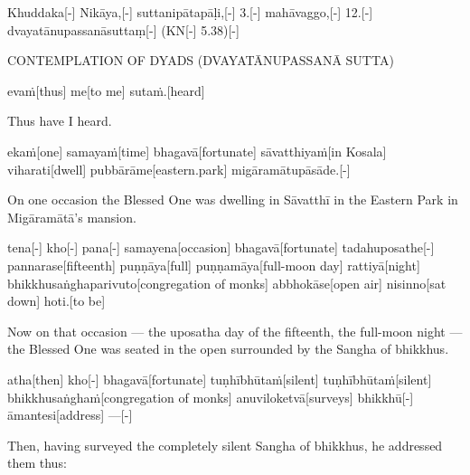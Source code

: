 
\begin{samepage}
\begingl[glneveryline={\PaliGlossA,\PaliGlossB}]
Khuddaka[-] Nikāya,[-] suttanipātapāḷi,[-] 3.[-] mahāvaggo,[-] 12.[-] dvayatānupassanāsuttaṃ[-] (KN[-] 5.38)[-]
\endgl
\nopagebreak
\linespread{0.5}
\begin{spacin}{0.2}
{ CONTEMPLATION OF DYADS (DVAYATĀNUPASSANĀ SUTTA)}
\end{spacin}
\vskip 12pt
\end{samepage}
\vskip 0.2in
\begin{samepage}
\begingl[glneveryline={\PaliGlossA,\PaliGlossB}]
evaṁ[thus] me[to me] sutaṁ.[heard]
\endgl
\nopagebreak
\linespread{0.5}
\begin{spacin}{0.2}
{\PaliGlossFT Thus have I heard.}
\end{spacin}
\vskip 12pt
\end{samepage}
\begin{samepage}
\begingl[glneveryline={\PaliGlossA,\PaliGlossB}]
ekaṁ[one] samayaṁ[time] bhagavā[fortunate] sāvatthiyaṁ[in Kosala] viharati[dwell] pubbārāme[eastern.park] migāramātupāsāde.[-]
\endgl
\nopagebreak
\linespread{0.5}
\begin{spacin}{0.2}
{\PaliGlossFT On one occasion the Blessed One was dwelling in Sāvatthī in the Eastern Park in Migāramātā’s mansion.}
\end{spacin}
\vskip 12pt
\end{samepage}
\begin{samepage}
\begingl[glneveryline={\PaliGlossA,\PaliGlossB}]
tena[-] kho[-] pana[-] samayena[occasion] bhagavā[fortunate] tadahuposathe[-] pannarase[fifteenth] puṇṇāya[full] puṇṇamāya[full-moon day] rattiyā[night] bhikkhusaṅghaparivuto[congregation of monks] abbhokāse[open air] nisinno[sat down] hoti.[to be]
\endgl
\nopagebreak
\linespread{0.5}
\begin{spacin}{0.2}
{\PaliGlossFT Now on that occasion — the uposatha day of the fifteenth, the full-moon night — the Blessed One was seated in the open surrounded by the Sangha of bhikkhus.}
\end{spacin}
\vskip 12pt
\end{samepage}
\begin{samepage}
\begingl[glneveryline={\PaliGlossA,\PaliGlossB}]
atha[then] kho[-] bhagavā[fortunate] tuṇhībhūtaṁ[silent] tuṇhībhūtaṁ[silent] bhikkhusaṅghaṁ[congregation of monks] anuviloketvā[surveys] bhikkhū[-] āmantesi[address] —[-]
\endgl
\nopagebreak
\linespread{0.5}
\begin{spacin}{0.2}
{\PaliGlossFT [140] Then, having surveyed the completely silent Sangha of bhikkhus, he addressed them thus:}
\end{spacin}
\vskip 12pt
\end{samepage}
